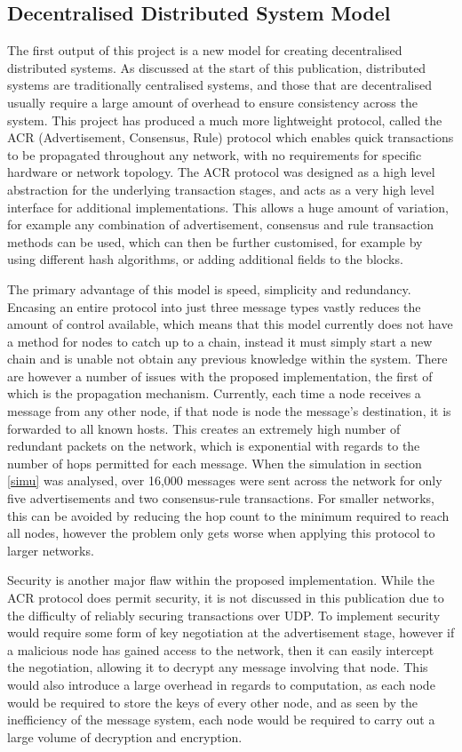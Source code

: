 \documentclass[a4paper, 11pt]{report}
\begin{document}
\subsection{Decentralised Distributed System Model}
The first output of this project is a new model for creating decentralised distributed systems. As discussed at the start of this publication, distributed systems are traditionally centralised systems, and those that are decentralised usually require a large amount of overhead to ensure consistency across the system. This project has produced a much more lightweight protocol, called the ACR (Advertisement, Consensus, Rule) protocol which enables quick transactions to be propagated throughout any network, with no requirements for specific hardware or network topology. The ACR protocol was designed as a high level abstraction for the underlying transaction stages, and acts as a very high level interface for additional implementations. This allows a huge amount of variation, for example any combination of advertisement, consensus and rule transaction methods can be used, which can then be further customised, for example by using different hash algorithms, or adding additional fields to the blocks.

The primary advantage of this model is speed, simplicity and redundancy. Encasing an entire protocol into just three message types vastly reduces the amount of control available, which means that this model currently does not have a method for nodes to catch up to a chain, instead it must simply start a new chain and is unable not obtain any previous knowledge within the system. There are however a number of issues with the proposed implementation, the first of which is the propagation mechanism. Currently, each time a node receives a message from any other node, if that node is node the message's destination, it is forwarded to all known hosts. This creates an extremely high number of redundant packets on the network, which is exponential with regards to the number of hops permitted for each message. When the simulation in section \ref{simu} was analysed, over 16,000 messages were sent across the network for only five advertisements and two consensus-rule transactions. For smaller networks, this can be avoided by reducing the hop count to the minimum required to reach all nodes, however the problem only gets worse when applying this protocol to larger networks.

Security is another major flaw within the proposed implementation. While the ACR protocol does permit security, it is not discussed in this publication due to the difficulty of reliably securing transactions over \acrshort{UDP}. To implement security would require some form of key negotiation at the advertisement stage, however if a malicious node has gained access to the network, then it can easily intercept the negotiation, allowing it to decrypt any message involving that node. This would also introduce a large overhead in regards to computation, as each node would be required to store the keys of every other node, and as seen by the inefficiency of the message system, each node would be required to carry out a large volume of decryption and encryption.
\end{document}
